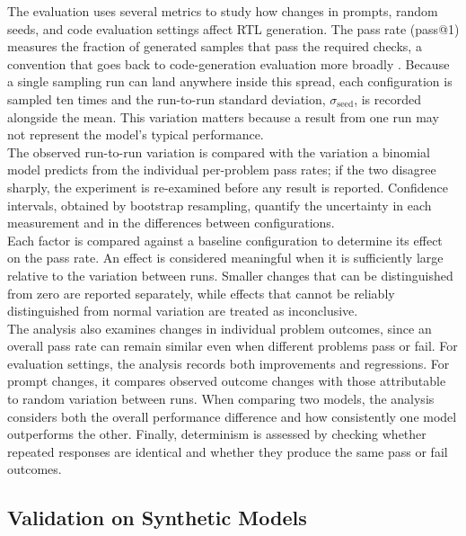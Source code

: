 \documentclass[conference]{IEEEtran}
\begin{document}
\noindent The evaluation uses several metrics to study how changes in prompts, random seeds, and code evaluation settings affect RTL generation. The pass rate (pass@1) measures the fraction of generated samples that pass the required checks, a convention that goes back to code-generation evaluation more broadly \cite{P17_Chen2021Codex}. Because a single sampling run can land anywhere inside this spread, each configuration is sampled ten times and the run-to-run standard deviation, $\sigma_{\text{seed}}$, is recorded alongside the mean. This variation matters because a result from one run may not represent the model's typical performance.\\

\noindent The observed run-to-run variation is compared with the variation a binomial model predicts from the individual per-problem pass rates; if the two disagree sharply, the experiment is re-examined before any result is reported. Confidence intervals, obtained by bootstrap resampling, quantify the uncertainty in each measurement and in the differences between configurations.\\

\noindent Each factor is compared against a baseline configuration to determine its effect on the pass rate. An effect is considered meaningful when it is sufficiently large relative to the variation between runs. Smaller changes that can be distinguished from zero are reported separately, while effects that cannot be reliably distinguished from normal variation are treated as inconclusive.\\

\noindent The analysis also examines changes in individual problem outcomes, since an overall pass rate can remain similar even when different problems pass or fail. For evaluation settings, the analysis records both improvements and regressions. For prompt changes, it compares observed outcome changes with those attributable to random variation between runs. When comparing two models, the analysis considers both the overall performance difference and how consistently one model outperforms the other. Finally, determinism is assessed by checking whether repeated responses are identical and whether they produce the same pass or fail outcomes.

\subsection{Validation on Synthetic Models}\label{sec_m_validation}
\end{document}
